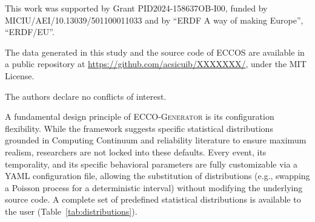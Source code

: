 \documentclass[ASNA]{USG} %
\begin{document}

This work was supported by Grant PID2024-158637OB-I00, funded by MICIU/AEI/10.13039/501100011033 and by “ERDF A way of making Europe”, “ERDF/EU”.



The data generated in this study and the source code of ECCOS are available in a public repository at \url{https://github.com/acsicuib/XXXXXXX/}, under the MIT License.


The authors declare no conflicts of interest.









\appendix

\vspace*{12pt}


A fundamental design principle of \textsc{ECCO-Generator} is its configuration flexibility. While the framework suggests specific statistical distributions grounded in Computing Continuum and reliability literature to ensure maximum realism, researchers are not locked into these defaults. Every event, its temporality, and its specific behavioral parameters are fully customizable via a YAML configuration file, allowing the substitution of distributions (e.g., swapping a Poisson process for a deterministic interval) without modifying the underlying source code. A complete set of predefined statistical distributions is available to the user (Table~\ref{tab:distributions}).
\end{document}
